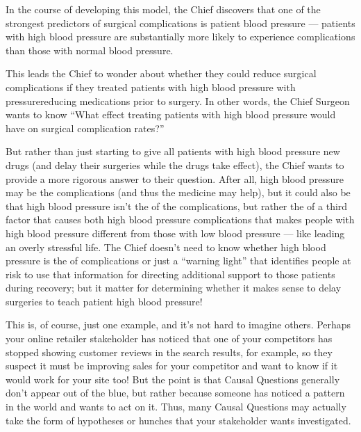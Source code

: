 \documentclass[letterpaper,10pt,english]{jupyterBook}
\begin{document}
\sphinxAtStartPar
In the course of developing this model, the Chief discovers that one of the strongest predictors of surgical complications is patient blood pressure — patients with high blood pressure are substantially more likely to experience complications than those with normal blood pressure.

\sphinxAtStartPar
This leads the Chief to wonder about whether they could reduce surgical complications if they treated patients with high blood pressure with pressure\sphinxhyphen{}reducing medications prior to surgery. In other words, the Chief Surgeon wants to know “What effect treating patients with high blood pressure would have on surgical complication rates?”

\sphinxAtStartPar
But rather than just starting to give all patients with high blood pressure new drugs (and delay their surgeries while the drugs take effect), the Chief wants  to provide a more rigorous answer to their question. After all, high blood pressure may be  the complications (and thus the medicine may help), but it could also be that high blood pressure isn’t the  of the complications, but rather the  of a third factor that causes both high blood pressure  complications that makes people with high blood pressure different from those with low blood pressure — like leading an overly stressful life. The Chief doesn’t need to know whether high blood pressure is the  of complications or just a “warning light” that identifies people at risk to use that information for directing additional support to those patients during recovery; but it  matter for determining whether it makes sense to delay surgeries to teach patient high blood pressure!

\sphinxAtStartPar
This is, of course, just one example, and it’s not hard to imagine others. Perhaps your online retailer stakeholder has noticed that one of your competitors has stopped showing customer reviews in the search results, for example, so they suspect it must be improving sales for your competitor and want to know if it would work for your site too! But the point is that Causal Questions generally don’t appear out of the blue, but rather because someone has noticed a pattern in the world and wants to act on it. Thus, many Causal Questions may actually take the form of hypotheses or hunches that your stakeholder wants investigated.
\end{document}
